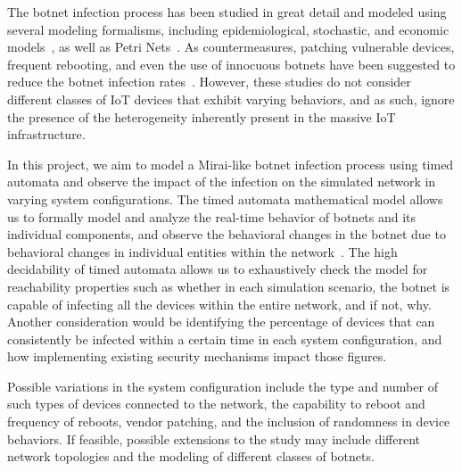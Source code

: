 The botnet infection process has been studied in great detail and modeled using several modeling formalisms, including epidemiological, stochastic, and economic models~\cite{wainwright2019_Botnet_Models}, as well as Petri Nets~\cite{tanaka2019_PN_Botnet}. As countermeasures, patching vulnerable devices, frequent rebooting, and even the use of innocuous botnets have been suggested to reduce the botnet infection rates~\cite{tanaka2019_PN_Botnet}. However, these studies do not consider different classes of IoT devices that exhibit varying behaviors, and as such, ignore the presence of the heterogeneity inherently present in the massive IoT infrastructure.


In this project, we aim to model a Mirai-like botnet infection process using timed automata and observe the impact of the infection on the simulated network in varying system configurations. The timed automata mathematical model allows us to formally model and analyze the real-time behavior of botnets and its individual components, and observe the behavioral changes in the botnet due to behavioral changes in individual entities within the network~\cite{alur1994_Theory_Timed_Automata}. The high decidability of timed automata allows us to exhaustively check the model for reachability properties such as whether in each simulation scenario, the botnet is capable of infecting all the devices within the entire network, and if not, why. Another consideration would be identifying the percentage of devices that can consistently be infected within a certain time in each system configuration, and how implementing existing security mechanisms impact those figures.



Possible variations in the system configuration include the type and number of such types of devices connected to the network, the capability to reboot and frequency of reboots, vendor patching, and the inclusion of randomness in device behaviors. If feasible, possible extensions to the study may include different network topologies and the modeling of different classes of botnets.